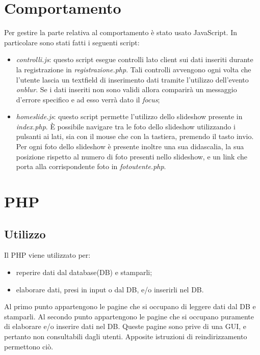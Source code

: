 	\section{Comportamento}
	Per gestire la parte relativa al comportamento è stato usato JavaScript. In particolare sono stati fatti i seguenti script:
	\begin{itemize}
	\item \textit{controlli.js}: questo script esegue controlli lato client sui dati inseriti durante la registrazione in \textit{registrazione.php}. Tali controlli avvengono ogni volta che l'utente lascia un textfield di inserimento dati tramite l'utilizzo dell'evento \textit{onblur}. Se i dati inseriti non sono validi allora comparirà un messaggio d'errore specifico e ad esso verrà dato il \textit{focus};
	\item \textit{homeslide.js}: questo script permette l'utilizzo dello slideshow presente in \textit{index.php}. È possibile navigare tra le foto dello slideshow utilizzando i pulsanti ai lati, sia con il mouse che con la tastiera, premendo il tasto invio. Per ogni foto dello slideshow è presente inoltre una sua didascalia, la sua posizione rispetto al numero di foto presenti nello slideshow, e un link che porta alla corrispondente foto in \textit{fotoutente.php}. 
	\end{itemize}
	\newpage
	\section{PHP}
	\subsection{Utilizzo}
	Il PHP viene utilizzato per:
	\begin{itemize}
	\item reperire dati dal database(DB) e stamparli;
	\item elaborare dati, presi in input o dal DB, e/o inserirli nel DB.
	\end{itemize} 
	
	Al primo punto appartengono le pagine che si occupano di leggere dati dal DB e stamparli.
	Al secondo punto appartengono le pagine che si occupano puramente di elaborare e/o inserire dati nel DB. Queste pagine sono prive di una GUI, e pertanto non consultabili dagli utenti. Apposite istruzioni di reindirizzamento permettono ciò.
	
